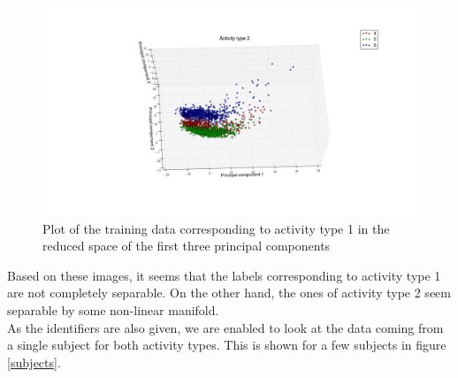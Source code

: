 \documentclass [a4paper] {report}
\begin{document}
	\begin{figure}[H]
		\begin{center}
			\includegraphics[scale=0.35]{Images/Xtrn2.png}
			\caption{Plot of the training data corresponding to activity type 1 in the reduced space of the first three principal components}
			\label{Xtrn2}
		\end{center}
	\end{figure}
	
	\noindent
	Based on these images, it seems that the labels corresponding to activity type 1 are not completely separable. On the other hand, the ones of activity type 2 seem separable by some non-linear manifold.\\
	
	\noindent
	As the identifiers are also given, we are enabled to look at the data coming from a single subject for both activity types. This is shown for a few subjects in figure \ref{subjects}.
	
\end{document}
